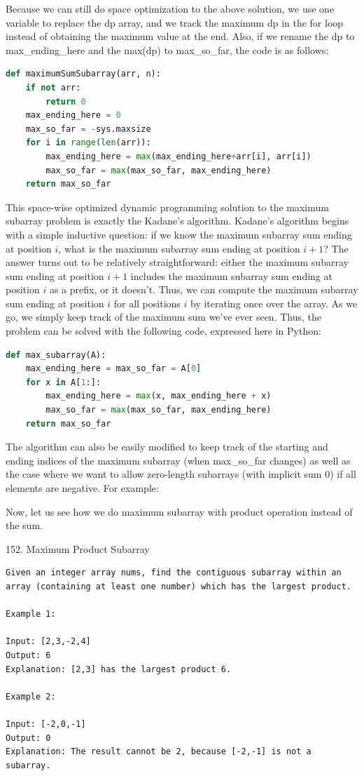 \documentclass[../specific-algorithms.tex]{subfiles}
\begin{document}
Because we can still do space optimization to the above solution, we use one variable to replace the dp array, and we track the maximum dp in the for loop instead of obtaining the maximum value at the end. Also, if we rename the dp to max\_ending\_here and the max(dp) to max\_so\_far, the code is as follows:
\begin{lstlisting}[language=Python]
def maximumSumSubarray(arr, n): 
    if not arr:
        return 0
    max_ending_here = 0
    max_so_far = -sys.maxsize
    for i in range(len(arr)):
        max_ending_here = max(max_ending_here+arr[i], arr[i])
        max_so_far = max(max_so_far, max_ending_here)
    return max_so_far
\end{lstlisting}
This space-wise optimized dynamic programming solution to the maximum subarray problem is exactly the Kadane's algorithm.  Kadane's algorithm begins with a simple inductive question: if we know the maximum subarray sum ending at position $i$, what is the maximum subarray sum ending at position $i+1$? The answer turns out to be relatively straightforward: either the maximum subarray sum ending at position $i+1$ includes the maximum subarray sum ending at position $i$ as a prefix, or it doesn't. Thus, we can compute the maximum subarray sum ending at position $i$ for all positions $i$ by iterating once over the array. As we go, we simply keep track of the maximum sum we've ever seen. Thus, the problem can be solved with the following code, expressed here in Python:
\begin{lstlisting}[language = Python]
def max_subarray(A):
    max_ending_here = max_so_far = A[0]
    for x in A[1:]:
        max_ending_here = max(x, max_ending_here + x)
        max_so_far = max(max_so_far, max_ending_here)
    return max_so_far
\end{lstlisting}

The algorithm can also be easily modified to keep track of the starting and ending indices of the maximum subarray (when max\_so\_far changes) as well as the case where we want to allow zero-length subarrays (with implicit sum 0) if all elements are negative. For example: 

Now, let us see how we do maximum subarray with product operation instead of the sum. 

152. Maximum Product Subarray
\begin{lstlisting}
Given an integer array nums, find the contiguous subarray within an array (containing at least one number) which has the largest product.

Example 1:

Input: [2,3,-2,4]
Output: 6
Explanation: [2,3] has the largest product 6.

Example 2:

Input: [-2,0,-1]
Output: 0
Explanation: The result cannot be 2, because [-2,-1] is not a subarray.
\end{lstlisting}
\end{document}

